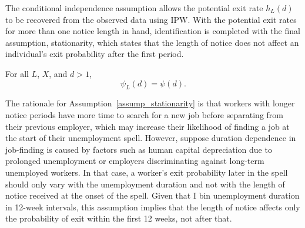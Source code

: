 \documentclass{div}
\begin{document}
The conditional independence assumption allows the potential exit rate $h_L(d)$ to be recovered from the observed data using IPW. With the potential exit rates for more than one notice length in hand, identification is completed with the final assumption, stationarity, which states that the length of notice does not affect an individual’s exit probability after the first period.

\begin{assump}[Stationarity]\label{assump_stationarity}
For all $L$, $X$, and $d>1$,
$$
\psi_L(d)=\psi(d).
$$
\end{assump}

The rationale for Assumption~\ref{assump_stationarity} is that workers with longer notice periods have more time to search for a new job before separating from their previous employer, which may increase their likelihood of finding a job at the start of their unemployment spell. However, suppose duration dependence in job-finding is caused by factors such as human capital depreciation due to prolonged unemployment or employers discriminating against long-term unemployed workers. In that case, a worker's exit probability later in the spell should only vary with the unemployment duration and not with the length of notice received at the onset of the spell. Given that I bin unemployment duration in 12-week intervals, this assumption implies that the length of notice affects only the probability of exit within the first 12 weeks, not after that.
\end{document}
